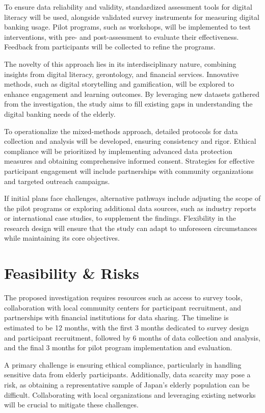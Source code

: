 \documentclass{article} %
\begin{document}
To ensure data reliability and validity, standardized assessment tools for digital literacy will be used, alongside validated survey instruments for measuring digital banking usage. Pilot programs, such as workshops, will be implemented to test interventions, with pre- and post-assessment to evaluate their effectiveness. Feedback from participants will be collected to refine the programs.

The novelty of this approach lies in its interdisciplinary nature, combining insights from digital literacy, gerontology, and financial services. Innovative methods, such as digital storytelling and gamification, will be explored to enhance engagement and learning outcomes. By leveraging new datasets gathered from the investigation, the study aims to fill existing gaps in understanding the digital banking needs of the elderly.

To operationalize the mixed-methods approach, detailed protocols for data collection and analysis will be developed, ensuring consistency and rigor. Ethical compliance will be prioritized by implementing advanced data protection measures and obtaining comprehensive informed consent. Strategies for effective participant engagement will include partnerships with community organizations and targeted outreach campaigns.

If initial plans face challenges, alternative pathways include adjusting the scope of the pilot programs or exploring additional data sources, such as industry reports or international case studies, to supplement the findings. Flexibility in the research design will ensure that the study can adapt to unforeseen circumstances while maintaining its core objectives.

\section{Feasibility \& Risks}
\label{sec:feasibility}
The proposed investigation requires resources such as access to survey tools, collaboration with local community centers for participant recruitment, and partnerships with financial institutions for data sharing. The timeline is estimated to be 12 months, with the first 3 months dedicated to survey design and participant recruitment, followed by 6 months of data collection and analysis, and the final 3 months for pilot program implementation and evaluation.

A primary challenge is ensuring ethical compliance, particularly in handling sensitive data from elderly participants. Additionally, data scarcity may pose a risk, as obtaining a representative sample of Japan's elderly population can be difficult. Collaborating with local organizations and leveraging existing networks will be crucial to mitigate these challenges.
\end{document}

